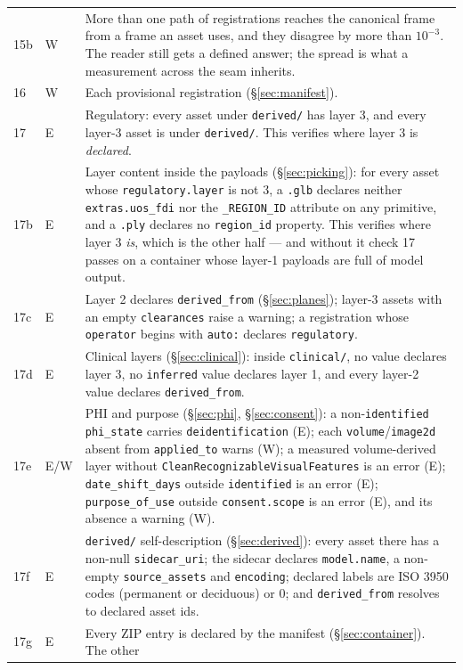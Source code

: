 \documentclass[11pt,a4paper]{article}
\newcommand{\code}[1]{\texttt{\small #1}}
\begin{document}
\begin{longtable}{C{0.8cm} C{0.9cm} L{13.4cm}}
15b & W & More than one path of registrations reaches the canonical frame
from a frame an asset uses, and they disagree by more than $10^{-3}$. The reader still gets
a defined answer; the spread is what a measurement across the seam inherits.\\
16 & W & Each provisional registration (\S\ref{sec:manifest}).\\
17 & E & Regulatory: every asset under \code{derived/} has layer 3, and every layer-3 asset
is under \code{derived/}. This verifies where layer 3 is \emph{declared}.\\
17b & E & Layer content inside the payloads (\S\ref{sec:picking}): for every asset whose
\code{regulatory.layer} is not 3, a \code{.glb} declares neither \code{extras.uos\_fdi} nor
the \code{\_REGION\_ID} attribute on any primitive, and a \code{.ply} declares no
\code{region\_id} property. This verifies where layer 3 \emph{is}, which is the other half
--- and without it check 17 passes on a container whose layer-1 payloads are full of model
output.\\
17c & E & Layer 2 declares \code{derived\_from} (\S\ref{sec:planes}); layer-3 assets with
an empty \code{clearances} raise a warning; a registration whose \code{operator} begins
with \code{auto:} declares \code{regulatory}.\\
17d & E & Clinical layers (\S\ref{sec:clinical}): inside \code{clinical/}, no value
declares layer 3, no \code{inferred} value declares layer 1, and every layer-2 value
declares \code{derived\_from}.\\
17e & E/W & PHI and purpose (\S\ref{sec:phi}, \S\ref{sec:consent}): a non-\code{identified}
\code{phi\_state} carries \code{deidentification} (E); each \code{volume}/\code{image2d}
absent from \code{applied\_to} warns (W); a measured volume-derived layer without
\code{CleanRecognizableVisualFeatures} is an error (E); \code{date\_shift\_days} outside
\code{identified} is an error (E); \code{purpose\_of\_use} outside
\code{consent.scope} is an error (E), and its absence a warning (W).\\
17f & E & \code{derived/} self-description (\S\ref{sec:derived}): every asset there has a
non-null \code{sidecar\_uri}; the sidecar declares \code{model.name}, a non-empty
\code{source\_assets} and \code{encoding}; declared labels are ISO 3950 codes (permanent or
deciduous) or 0; and \code{derived\_from} resolves to declared asset ids.\\
17g & E & Every ZIP entry is declared by the manifest (\S\ref{sec:container}). The other

\end{longtable}
\end{document}
